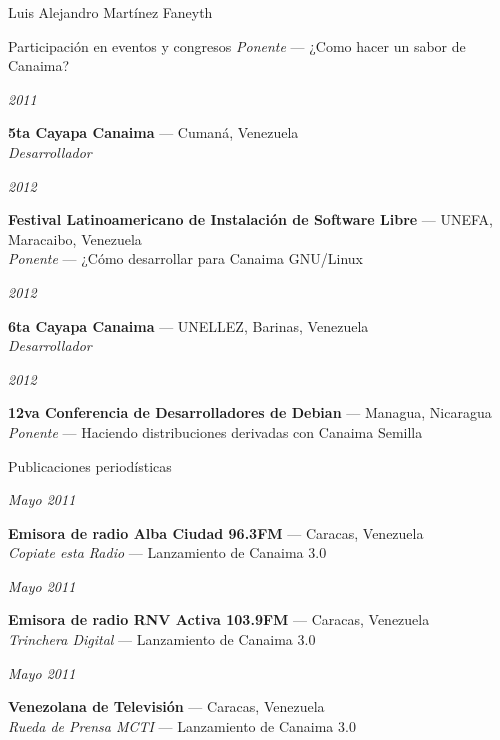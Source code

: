 \documentclass[11pt,letterpaper]{article}
\begin{document}
\begin{cv}{Luis Alejandro Mart\'inez Faneyth}
\begin{cvlist}{Participaci\'on en eventos y congresos}
{{		\textit{Ponente} --- ¿Como hacer un sabor de Canaima?
	}
}
\item[{\parbox[t]{6em}{\textit{\large{2011}}}}]{
	\parbox[t]{\linewidth}{
		\textbf{5ta Cayapa Canaima} --- Cuman\'a, Venezuela\\
		\textit{Desarrollador}
	}
}
\item[{\parbox[t]{6em}{\textit{\large{2012}}}}]{
	\parbox[t]{\linewidth}{
		\textbf{Festival Latinoamericano de Instalaci\'on de Software Libre} --- UNEFA, Maracaibo, Venezuela\\
		\textit{Ponente} --- ¿C\'omo desarrollar para Canaima GNU/Linux
	}
}
\item[{\parbox[t]{6em}{\textit{\large{2012}}}}]{
	\parbox[t]{\linewidth}{
		\textbf{6ta Cayapa Canaima} --- UNELLEZ, Barinas, Venezuela\\
		\textit{Desarrollador}
	}
}
\item[{\parbox[t]{6em}{\textit{\large{2012}}}}]{
	\parbox[t]{\linewidth}{
		\textbf{12va Conferencia de Desarrolladores de Debian} --- Managua, Nicaragua\\
		\textit{Ponente} --- Haciendo distribuciones derivadas con Canaima Semilla
	}
}
\end{cvlist}

\begin{cvlist}{Publicaciones period\'isticas}
\item[{\parbox[t]{6em}{\textit{\large{Mayo 2011}}}}]{
	\parbox[t]{\linewidth}{
		\textbf{Emisora de radio Alba Ciudad 96.3FM} --- Caracas, Venezuela\\
		\textit{Copiate esta Radio} --- Lanzamiento de Canaima 3.0
	}
}
\item[{\parbox[t]{6em}{\textit{\large{Mayo 2011}}}}]{
	\parbox[t]{\linewidth}{
		\textbf{Emisora de radio RNV Activa 103.9FM} --- Caracas, Venezuela\\
		\textit{Trinchera Digital} --- Lanzamiento de Canaima 3.0
	}
}
\item[{\parbox[t]{6em}{\textit{\large{Mayo 2011}}}}]{
	\parbox[t]{\linewidth}{
		\textbf{Venezolana de Televisi\'on} --- Caracas, Venezuela\\
		\textit{Rueda de Prensa MCTI} --- Lanzamiento de Canaima 3.0
	}
}
\end{cvlist}


\end{cv}
\end{document}
